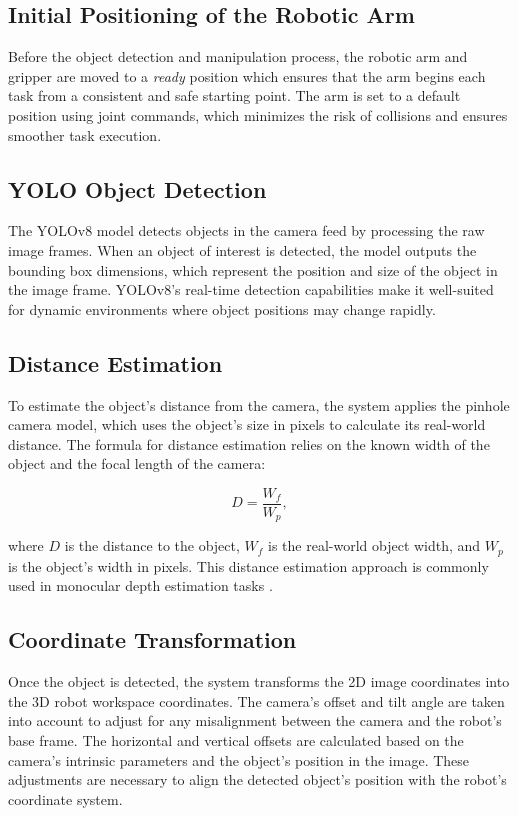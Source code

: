 \subsection{Initial Positioning of the Robotic Arm}
Before the object detection and manipulation process, the robotic arm and gripper are moved to a \textit{ready} position which ensures that the arm begins each task from a consistent and safe starting point. The arm is set to a default position using joint commands, which minimizes the risk of collisions and ensures smoother task execution.

\subsection{YOLO Object Detection}
The YOLOv8 model detects objects in the camera feed by processing the raw image frames. When an object of interest is detected, the model outputs the bounding box dimensions, which represent the position and size of the object in the image frame. YOLOv8’s real-time detection capabilities make it well-suited for dynamic environments where object positions may change rapidly.

\subsection{Distance Estimation}
To estimate the object’s distance from the camera, the system applies the pinhole camera model, which uses the object’s size in pixels to calculate its real-world distance. The formula for distance estimation relies on the known width of the object and the focal length of the camera:

\begin{equation}
    D = \frac{W_f}{W_p},
\end{equation}

where $D$ is the distance to the object, $W_f$ is the real-world object width, and $W_p$ is the object’s width in pixels. This distance estimation approach is commonly used in monocular depth estimation tasks \cite{godard2017unsupervisedmonoculardepthestimation}.

\subsection{Coordinate Transformation}
Once the object is detected, the system transforms the 2D image coordinates into the 3D robot workspace coordinates. The camera's offset and tilt angle are taken into account to adjust for any misalignment between the camera and the robot’s base frame. The horizontal and vertical offsets are calculated based on the camera's intrinsic parameters and the object’s position in the image. These adjustments are necessary to align the detected object’s position with the robot's coordinate system.

